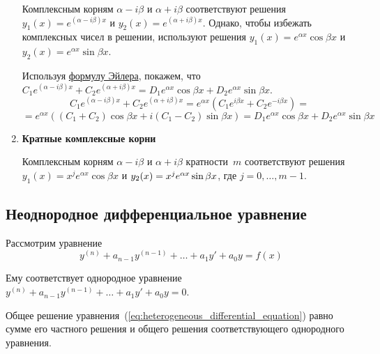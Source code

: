 \begin{enumerate}
	Комплексным корням $\alpha - i \beta$ и $\alpha + i \beta$ соответствуют решения~$y_1(x) = e^{(\alpha - i \beta) x}$ и $y_2(x) = e^{(\alpha + i \beta) x}$.
	Однако, чтобы избежать комплексных чисел в решении, используют решения $y_1(x) = e^{\alpha x} \cos \beta x$ и $y_2(x) = e^{\alpha x} \sin \beta x$.
	
	Используя \hyperref[eq:Euler's_formula]{формулу Эйлера}, покажем, что $C_1 e^{(\alpha - i \beta) x} + C_2 e^{(\alpha + i \beta) x} = D_1 e^{\alpha x} \cos \beta x + D_2 e^{\alpha x} \sin \beta x$.
	\begin{equation*}
	C_1 e^{(\alpha - i \beta) x} + C_2 e^{(\alpha + i \beta) x} =
	e^{\alpha x} (C_1 e^{i \beta x} + C_2 e^{-i \beta x}) =
	\end{equation*}
	\begin{equation*}
	= e^{\alpha x} ((C_1 + C_2) \cos \beta x + i(C_1 - C_2) \sin \beta x) =
	D_1 e^{\alpha x} \cos \beta x + D_2 e^{\alpha x} \sin \beta x
	\end{equation*}
	
	\item \textbf{Кратные комплексные корни}
	
	Комплексным корням $\alpha - i \beta$ и $\alpha + i \beta$ кратности~$m$ соответствуют решения $y_1(x) = x^j e^{\alpha x} \cos \beta x$ и $y_2(x) \opbr= x^j e^{\alpha x} \sin \beta x$, где $j = 0, \ldots, m - 1$.
\end{enumerate}

\subsection{Неоднородное дифференциальное уравнение}
Рассмотрим уравнение
\begin{equation}
\label{eq:heterogeneous_differential_equation}
y^{(n)} + a_{n-1} y^{(n-1)} + \ldots + a_1 y' + a_0 y = f(x)
\end{equation}

Ему соответствует однородное уравнение $y^{(n)} + a_{n-1} y^{(n-1)} + \ldots + a_1 y' + a_0 y = 0$.

\begin{statement}
Общее решение уравнения~(\ref*{eq:heterogeneous_differential_equation}) равно сумме его частного решения и общего решения соответствующего однородного уравнения.
\end{statement}

